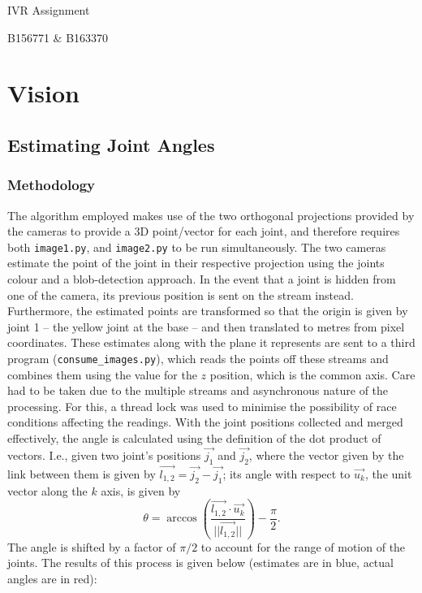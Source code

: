 \documentclass[11pt]{article}
\begin{document}
\begin{center}
    IVR Assignment

    B156771 \& B163370
\end{center}
\section{Vision}
\subsection{Estimating Joint Angles}
\subsubsection{Methodology}
The algorithm employed makes use of the two orthogonal projections provided by the cameras to provide a 3D point/vector for each joint, and therefore requires both \texttt{image1.py}, and \texttt{image2.py} to be run simultaneously.
The two cameras estimate the point of the joint in their respective projection using the joints colour and a blob-detection approach.
In the event that a joint is hidden from one of the camera, its previous position is sent on the stream instead.
Furthermore, the estimated points are transformed so that the origin is given by joint 1 -- the yellow joint at the base -- and then translated to metres from pixel coordinates. 
These estimates along with the plane it represents are sent to a third program (\texttt{consume\_images.py}), which reads the points off these streams and combines them using the value for the $z$ position, which is the common axis. 
Care had to be taken due to the multiple streams and asynchronous nature of the processing. 
For this, a thread lock was used to minimise the possibility of race conditions affecting the readings. 
With the joint positions collected and merged effectively, the angle is calculated using the definition of the dot product of vectors.
I.e., given two joint's positions $\vec{j_1}$ and $\vec{j_2}$, where the vector given by the link between them is given by $\vec{l_{1,2}} = \vec{j_2} - \vec{j_1}$; its angle with respect to $\vec{u_k}$, the unit vector along the $k$ axis, is given by $$ \theta = \arccos\left(\frac{\vec{l_{1,2}}\cdot \vec{u_k}}{||\vec{l_{1,2}}||}\right) - \frac{\pi}{2}.$$
The angle is shifted by a factor of $\pi/2$ to account for the range of motion of the joints.
The results of this process is given below (estimates are in blue, actual angles are in red):
\end{document}
